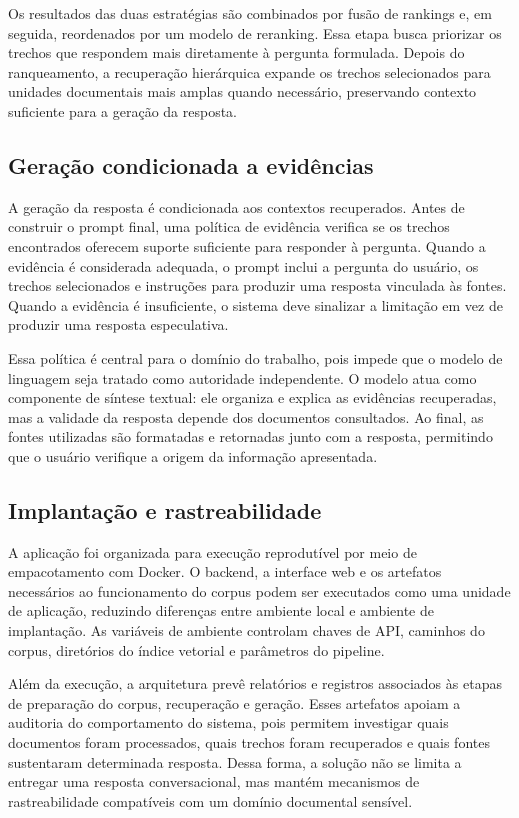 Os resultados das duas estratégias são combinados por fusão de rankings e, em seguida, reordenados por um modelo de reranking. Essa etapa busca priorizar os trechos que respondem mais diretamente à pergunta formulada. Depois do ranqueamento, a recuperação hierárquica expande os trechos selecionados para unidades documentais mais amplas quando necessário, preservando contexto suficiente para a geração da resposta.

\subsection{Geração condicionada a evidências}

A geração da resposta é condicionada aos contextos recuperados. Antes de construir o prompt final, uma política de evidência verifica se os trechos encontrados oferecem suporte suficiente para responder à pergunta. Quando a evidência é considerada adequada, o prompt inclui a pergunta do usuário, os trechos selecionados e instruções para produzir uma resposta vinculada às fontes. Quando a evidência é insuficiente, o sistema deve sinalizar a limitação em vez de produzir uma resposta especulativa.

Essa política é central para o domínio do trabalho, pois impede que o modelo de linguagem seja tratado como autoridade independente. O modelo atua como componente de síntese textual: ele organiza e explica as evidências recuperadas, mas a validade da resposta depende dos documentos consultados. Ao final, as fontes utilizadas são formatadas e retornadas junto com a resposta, permitindo que o usuário verifique a origem da informação apresentada.

\subsection{Implantação e rastreabilidade}

A aplicação foi organizada para execução reprodutível por meio de empacotamento com Docker. O backend, a interface web e os artefatos necessários ao funcionamento do corpus podem ser executados como uma unidade de aplicação, reduzindo diferenças entre ambiente local e ambiente de implantação. As variáveis de ambiente controlam chaves de API, caminhos do corpus, diretórios do índice vetorial e parâmetros do pipeline.

Além da execução, a arquitetura prevê relatórios e registros associados às etapas de preparação do corpus, recuperação e geração. Esses artefatos apoiam a auditoria do comportamento do sistema, pois permitem investigar quais documentos foram processados, quais trechos foram recuperados e quais fontes sustentaram determinada resposta. Dessa forma, a solução não se limita a entregar uma resposta conversacional, mas mantém mecanismos de rastreabilidade compatíveis com um domínio documental sensível.
